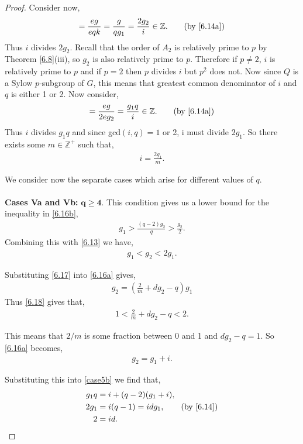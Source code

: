 \documentclass[a4paper , 11pt]{book}
\theoremstyle{definition}
\theoremstyle{remark}
\begin{document}
\begin{proof}
Consider now,
\begin{align*} [G : N_G(Q)] = \frac{eg}{e q k} = \frac{g}{q g_1} = \frac{2 g_2}{i} \in \mathbb{Z}. \tag{by \eqref{6.14a}}
\end{align*}
Thus $i$ divides $2 g_2$. Recall that the order of $A_2$ is relatively prime to $p$ by Theorem \ref{6.8}(iii), so $g_2$ is also relatively prime to $p$. Therefore if $p \neq 2$, $i$ is relatively prime to $p$ and if $p=2$ then $p$ divides $i$ but $p^2$ does not. Now since $Q$ is a Sylow $p$-subgroup of $G$, this means that greatest common denominator of $i$ and $q$ is either 1 or 2.
Now consider,
\begin{align*} [G : N_G(A_2)] = \frac{eg}{2 e g_2} = \frac{g_1 q}{i} \in \mathbb{Z}. \tag{by \eqref{6.14a}}
\end{align*}
Thus $i$ divides $g_1 q$ and since gcd$(i, q) = 1$ or 2, i must divide $2 g_1$. So there exists some $m \in \mathbb{Z^+}$ such that,
\begin{align}\label{6.17} i = \frac{2 g_1}{m}.
\end{align}

We consider now the separate cases which arise for different values of $q$. \\
\\
\textbullet \space \textbf{Cases Va and Vb:} $\pmb{q \geq 4}$. This condition gives us a lower bound for the inequality in \eqref{6.16b},
\begin{align*} g_1 > \frac{(q-2) g_2}{q} > \frac{g_2}{2}.
\end{align*}
Combining this with \eqref{6.13} we have,
\begin{align}\label{6.18} g_1 < g_2 < 2 g_1.
\end{align}

Substituting \eqref{6.17} into \eqref{6.16a} gives,
\begin{align*} g_2 = \left( \frac{2}{m} + d g_2 - q \right) g_1
\end{align*}
Thus \eqref{6.18} gives that,
\begin{align*} 1 < \frac{2}{m} + d g_2 - q < 2.
\end{align*}

This means that $2/m$ is some fraction between 0 and 1 and $d g_2 - q = 1$. So \eqref{6.16a} becomes,
\begin{align}\label{6.19} g_2 = g_1 + i.
\end{align}

Substituting this into \eqref{case5b} we find that,
\begin{align*} g_1 q &= i + (q - 2)(g_1 + i),
\\ 2 g_1 &= i(q - 1) = i d g_1, \tag{by \eqref{6.14}}
\\ 2 &= i d.
\end{align*}


\end{proof}
\end{document}
